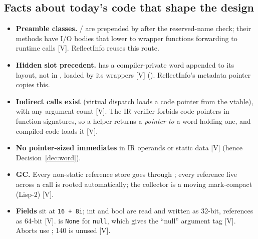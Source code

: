\documentclass[10pt]{article}
\newcommand{\code}[1]{\texttt{\small #1}}
\newcommand{\mV}{\textsf{\scriptsize[V]}}
\begin{document}
\subsection{Facts about today's code that shape the design}\label{sec:lo5-facts}
\begin{itemize}
\item \textbf{Preamble classes.} / are prepended by  after the reserved-name check; their methods have I/O bodies that lower to wrapper functions forwarding to runtime calls \mV. ReflectInfo reuses this route.
\item \textbf{Hidden slot precedent.}  has a compiler-private word appended to its layout, not in , loaded by its wrappers \mV{} (). ReflectInfo's metadata pointer copies this.
\item \textbf{Indirect calls exist} (virtual dispatch loads a code pointer from the vtable), with any argument count \mV. The IR verifier forbids code pointers in function signatures, so a helper returns a \emph{pointer to} a word holding one, and compiled code loads it \mV.
\item \textbf{No pointer-sized immediates} in IR operands or static data \mV{} (hence Decision~\ref{dec:word}).
\item \textbf{GC.} Every non-static reference store goes through ; every reference live across a call is rooted automatically; the collector is a moving mark-compact (Lisp-2) \mV.
\item \textbf{Fields} sit at \code{16 + 8i}; int and bool are read and written as 32-bit, references as 64-bit \mV.  is \code{None} for \code{null}, which gives the ``null'' argument tag \mV. Aborts use ; 140 is unused \mV.
\end{itemize}
\end{document}
